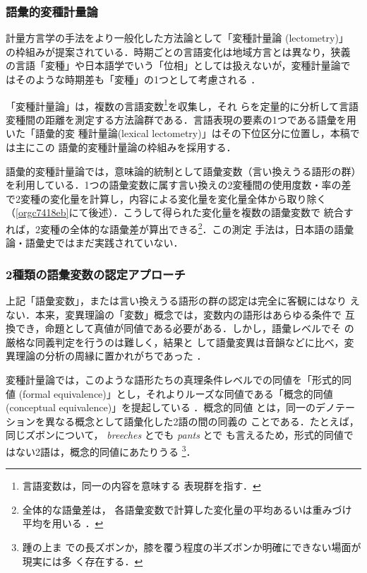 \documentclass[submit]{ipsj}
\renewcommand{\ref}{\cref}
\begin{document}
\subsubsection{語彙的変種計量論\label{orgb32cf23}}
\label{sec:org27c660d}
計量方言学の手法をより一般化した方法論として「変種計量論 (lectometry)」
の枠組みが提案されている．時期ごとの言語変化は地域方言とは異なり，狭義
の言語「変種」や日本語学でいう「位相」としては扱えないが，変種計量論で
はそのような時期差も「変種」の1つとして考慮される
\cite{Geeraerts2023Lexical}．

「変種計量論」は，複数の言語変数\footnote{言語変数は，同一の内容を意味する
表現群を指す\cite[, 188]{Labov1972Sociolinguistic}．}を収集し，それ
らを定量的に分析して言語変種間の距離を測定する方法論群である\cite{Ruette2014Semantic}．言語表現の要素の1つである語彙を用いた「語彙的変
種計量論(lexical lectometry)」はその下位区分に位置し，本稿では主にこの
語彙的変種計量論の枠組みを採用する．

語彙的変種計量論では，意味論的統制として語彙変数（言い換えうる語形の群）
を利用している．1つの語彙変数に属す言い換えの2変種間の使用度数・率の差
で2変種の変化量を計算し，内容による変化量を変化量全体から取り除く
（\ref{orgc7418eb}にて後述）．こうして得られた変化量を複数の語彙変数で
統合すれば，2変種の全体的な語彙差が算出できる\footnote{全体的な語彙差は，
各語彙変数で計算した変化量の平均あるいは重みづけ平均を用いる
\cite{Ruette2014Semantic,Speelman2003Profilebased}．}．この測定
手法は，日本語の語彙論・語彙史ではまだ実践されていない．
\subsubsection{2種類の語彙変数の認定アプローチ}
\label{sec:orgbd03f46}
上記「語彙変数」，または言い換えうる語形の群の認定は完全に客観にはなり
えない．本来，変異理論の「変数」概念では，変数内の語形はあらゆる条件で
互換でき，命題として真値が同値である必要がある．しかし，語彙レベルでそ
の厳格な同義判定を行うのは難しく\cite{Lavandera1978Where}，結果と
して語彙変異は音韻などに比べ，変異理論の分析の周縁に置かれがちであった
\cite{DePascale2019Tokenbased}．

変種計量論では，このような語形たちの真理条件レベルでの同値を「形式的同
値 (formal equivalence)」とし，それよりルーズな同値である「概念的同値
(conceptual equivalence)」を提起している
\cite{Geeraerts2023Lexical,DePascale2019Tokenbased}．概念的同値
とは，同一のデノテーションを異なる概念として語彙化した2語の間の同義の
ことである．たとえば，同じズボンについて， \emph{breeches} とでも \emph{pants} とで
も言えるため，形式的同値ではない2語は，概念的同値にあたりうる
\cite{DePascale2019Tokenbased,Geeraerts2023Lexical}\footnote{踵の上ま
での長ズボンか，膝を覆う程度の半ズボンか明確にできない場面が現実には多
く存在する．}．
\end{document}

